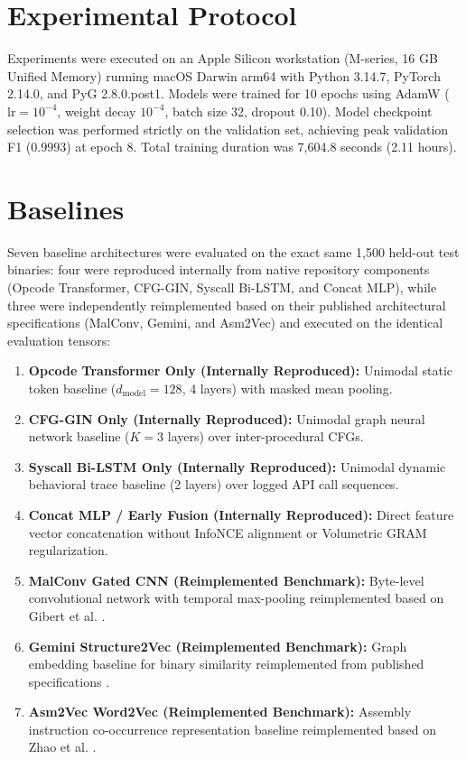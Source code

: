 \documentclass[pdflatex,sn-mathphys-num]{sn-jnl}
\begin{document}
\section{Experimental Protocol}\label{sec:protocol}
Experiments were executed on an Apple Silicon workstation (M-series, 16 GB Unified Memory) running macOS Darwin arm64 with Python 3.14.7, PyTorch 2.14.0, and PyG 2.8.0.post1. Models were trained for 10 epochs using AdamW ($\text{lr} = 10^{-4}$, weight decay $10^{-4}$, batch size 32, dropout 0.10). Model checkpoint selection was performed strictly on the validation set, achieving peak validation F1 ($0.9993$) at epoch 8. Total training duration was 7,604.8 seconds (2.11 hours).

\section{Baselines}\label{sec:baselines}
Seven baseline architectures were evaluated on the exact same 1,500 held-out test binaries: four were reproduced internally from native repository components (Opcode Transformer, CFG-GIN, Syscall Bi-LSTM, and Concat MLP), while three were independently reimplemented based on their published architectural specifications (MalConv, Gemini, and Asm2Vec) and executed on the identical evaluation tensors:
\begin{enumerate}
    \item \textbf{Opcode Transformer Only (Internally Reproduced):} Unimodal static token baseline ($d_{\text{model}} = 128$, 4 layers) with masked mean pooling.
    \item \textbf{CFG-GIN Only (Internally Reproduced):} Unimodal graph neural network baseline ($K = 3$ layers) over inter-procedural CFGs.
    \item \textbf{Syscall Bi-LSTM Only (Internally Reproduced):} Unimodal dynamic behavioral trace baseline (2 layers) over logged API call sequences.
    \item \textbf{Concat MLP / Early Fusion (Internally Reproduced):} Direct feature vector concatenation without InfoNCE alignment or Volumetric GRAM regularization.
    \item \textbf{MalConv Gated CNN (Reimplemented Benchmark):} Byte-level convolutional network with temporal max-pooling reimplemented based on Gibert et al. \cite{Gibert2020}.
    \item \textbf{Gemini Structure2Vec (Reimplemented Benchmark):} Graph embedding baseline for binary similarity reimplemented from published specifications \cite{Kim2023Revisiting}.
    \item \textbf{Asm2Vec Word2Vec (Reimplemented Benchmark):} Assembly instruction co-occurrence representation baseline reimplemented based on Zhao et al. \cite{BinCola2024}.
\end{enumerate}
\end{document}
